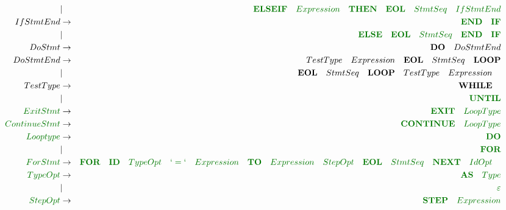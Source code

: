 \documentclass[a4paper,11pt,landscape,leqno]{article}
\begin{document}
\begin{eqnarray}
&   |       &    \textcolor{green1}{\textbf{ELSEIF}\quad Expression\quad \textbf{THEN}\quad \textbf{EOL}\quad StmtSeq \quad IfStmtEnd}   \\
IfStmtEnd  &   \rightarrow  &\textcolor{green1}{\textbf{END}\quad \textbf{IF}}  \\
&   |      &    \textcolor{green1}{\textbf{ELSE}\quad  \textbf{EOL}\quad StmtSeq\quad \textbf{END}\quad \textbf{IF}}   \\
DoStmt&    \rightarrow    & \textbf{DO} \quad DoStmtEnd   \\
DoStmtEnd&   \rightarrow  &  TestType \quad  Expression \quad \textbf{EOL} \quad StmtSeq \quad \textbf{LOOP}    \\
&    | &\textbf{EOL} \quad StmtSeq \quad \textbf{LOOP}\quad TestType \quad  Expression \quad   \\
TestType & \rightarrow  &   \textbf{WHILE}\quad \\
        &       |       & \textcolor{green1}{\textbf{UNTIL}} \\
\textcolor{green1}{ExitStmt} & \rightarrow & \textcolor{green1}{\textbf{EXIT}\quad LoopType}    \\
\textcolor{green1}{ContinueStmt} & \rightarrow & \textcolor{green1}{\textbf{CONTINUE}\quad LoopType}    \\
\textcolor{green1}{Looptype} & \rightarrow & \textcolor{green1}{\textbf{DO}}\\
&   |       &   \textcolor{green1}{\textbf{FOR}}   \\
\textcolor{green1}{ForStmt} &    \rightarrow    &  \textcolor{green1}{\textbf{FOR}\quad \textbf{ID}\quad TypeOpt\quad `=`\quad Expression\quad \textbf{TO}\quad Expression\quad StepOpt\quad \textbf{EOL}\quad StmtSeq\quad \textbf{NEXT}\quad IdOpt\quad} \\
\textcolor{green1}{TypeOpt} & \rightarrow  & \textcolor{green1}{\textbf{AS}\quad Type} \\
& | &   \textcolor{green1}{\varepsilon} \\
\textcolor{green1}{StepOpt} & \rightarrow  & \textcolor{green1}{\textbf{STEP}\quad Expression} \\

\end{eqnarray}
\end{document}

